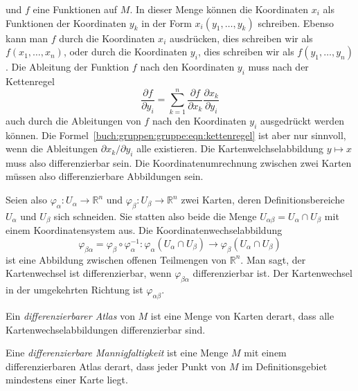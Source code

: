 und $f$ eine Funktionen auf $M$.
In dieser Menge können die Koordinaten $x_i$ als Funktionen der 
Koordinaten $y_k$ in der Form $x_i(y_1,\dots,y_k)$ schreiben.
Ebenso kann man $f$ durch die Koordinaten $x_i$ ausdrücken, dies
schreiben wir als $f(x_1,\dots,x_n)$, oder durch die Koordinaten $y_i$,
dies schreiben wir als $f(y_1,\dots,y_n)$.
Die Ableitung der Funktion $f$ nach den Koordinaten $y_i$ muss nach
der Kettenregel
\begin{equation}
\frac{\partial f}{\partial y_i}
=
\sum_{k=1}^n
\frac{\partial f}{\partial x_k} \frac{\partial x_k}{\partial y_i}
\label{buch:gruppen:gruppe:eqn:kettenregel}
\end{equation}
auch durch die Ableitungen von $f$ nach den Koordinaten $y_i$
ausgedrückt werden können.
Die Formel~\ref{buch:gruppen:gruppe:eqn:kettenregel} ist aber nur sinnvoll,
wenn die Ableitungen $\partial x_k/\partial y_i$ alle existieren.
Die Kartenwelchselabbildung $y\mapsto x$ muss also differenzierbar sein.
Die Koordinatenumrechnung zwischen zwei Karten müssen also differenzierbare
Abbildungen sein.

Seien also
$\varphi_\alpha\colon U_\alpha \to \mathbb{R}^n$
und
$\varphi_\beta\colon U_\beta \to \mathbb{R}^n$
zwei Karten, deren Definitionsbereiche $U_\alpha$ und $U_\beta$ sich
schneiden.
Sie statten also beide die Menge $U_{\alpha\beta}=U_\alpha\cap U_\beta$
mit einem Koordinatensystem aus.
Die Koordinatenwechselabbildung
\[
\varphi_{\beta\alpha}
=
\varphi_\beta
\circ
\varphi_\alpha^{-1}
\colon
\varphi_\alpha(U_\alpha\cap U_\beta)
\to
\varphi_\beta(U_\alpha\cap U_\beta)
\]
ist eine Abbildung zwischen offenen Teilmengen von $\mathbb{R}^n$.
Man sagt, der Kartenwechsel ist differenzierbar, wenn $\varphi_{\beta\alpha}$
differenzierbar ist.
Der Kartenwechsel in der umgekehrten Richtung ist $\varphi_{\alpha\beta}$.

\begin{definition}
\label{buch:gruppen:gruppe:def:atlas}
Ein {\em differenzierbarer Atlas} von $M$ ist eine Menge von Karten derart,
dass alle Kartenwechselabbildungen differenzierbar sind.
\end{definition}

\begin{definition}
\label{buch:gruppen:gruppe:def:diffman}
Eine {\em differenzierbare Mannigfaltigkeit} ist eine Menge $M$ mit einem
differenzierbaren Atlas derart, dass jeder Punkt von $M$ im
Definitionsgebiet mindestens einer Karte liegt.
\end{definition}


